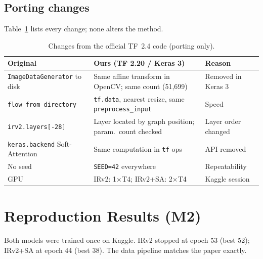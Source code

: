 \documentclass[conference]{IEEEtran}
\begin{document}
\subsection{Porting changes}
Table~\ref{tab:port} lists every change; none alters the method.

\begin{table}[t]
\caption{Changes from the official TF~2.4 code (porting only).}
\label{tab:port}
\centering
\footnotesize
\setlength{\tabcolsep}{3pt}\raggedright
\begin{tabular}{>{\raggedright\arraybackslash}p{}>{\raggedright\arraybackslash}p{}>{\raggedright\arraybackslash}p{}}
\toprule
Original & Ours (TF 2.20 / Keras 3) & Reason\\
\midrule
\texttt{ImageData\-Generator} to disk & Same affine transform in OpenCV; same count (51,699) & Removed in Keras 3\\
\texttt{flow\_from\_\-directory} & \texttt{tf.data}, nearest resize, same \texttt{preprocess\_\-input} & Speed\\
\texttt{irv2.layers[-28]} & Layer located by graph position; param.\ count checked & Layer order changed\\
\texttt{keras.backend} Soft-Attention & Same computation in \texttt{tf} ops & API removed\\
No seed & \texttt{SEED=42} everywhere & Repeatability\\
1 GPU & IRv2: 1$\times$T4; IRv2+SA: 2$\times$T4 & Kaggle session\\
\bottomrule
\end{tabular}
\end{table}

\section{Reproduction Results (M2)}\label{sec:results}
Both models were trained once on Kaggle. IRv2 stopped at epoch 53 (best 52); IRv2+SA at epoch 44 (best 38). The data pipeline matches the paper exactly.
\end{document}
